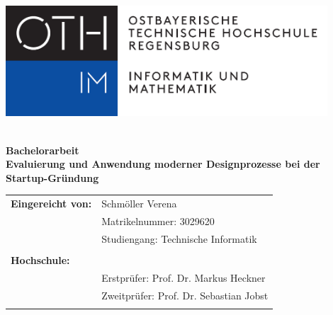 \def\acroname{Titelseite}
\includegraphics[width=12cm]{99_IMG/00_img/FSIM_logo.png}
\\
\\


\vspace*{2cm}

\Huge \textbf{Bachelorarbeit} 
\vspace{2cm}
\\
\Large \textbf{Evaluierung und Anwendung moderner Designprozesse bei der Startup-Gründung} \\

\vspace{2cm}

\normalsize
\hspace{-2mm}
\begin{tabularx}{\textwidth}{l X}
	\textbf{Eingereicht von:} & Schmöller Verena \\
							  & Matrikelnummer: 3029620 \\
							  & Studiengang: Technische Informatik \\
							  & \\
								
	\textbf{Hochschule:} & \oth \\
								& Erstprüfer: Prof. Dr. Markus Heckner \\
								& Zweitprüfer: Prof. Dr. Sebastian Jobst \\
								& \\
%					 
\end{tabularx}